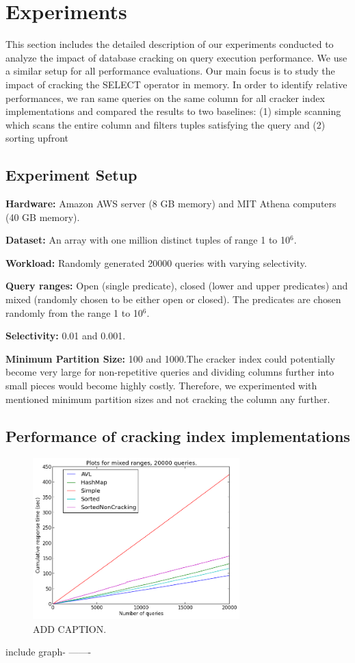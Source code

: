 \section{Experiments}
This section includes the detailed description of our experiments conducted to analyze the impact of database cracking on query execution performance. We use a similar setup for all performance evaluations. Our main focus is to study the impact of cracking the SELECT operator in memory. In order to identify relative performances, we ran same queries on the same column for all cracker index implementations and compared the results to two baselines: (1) simple scanning which scans the entire column and filters tuples satisfying the query and (2) sorting upfront 

\subsection{Experiment Setup}

\textbf{Hardware:} Amazon AWS server (8 GB memory) and MIT Athena computers (40 GB memory). 

\textbf{Dataset:} An array with one million distinct tuples of range 1 to 10${^6}$. 

\textbf{Workload:} Randomly generated 20000 queries with varying selectivity.

\textbf{Query ranges:} Open (single predicate), closed (lower and upper predicates) and mixed (randomly chosen to be either open or closed).
The predicates are chosen randomly from the range 1 to 10${^6}$.

\textbf{Selectivity:} 0.01 and 0.001. 

\textbf{Minimum Partition Size: } 100 and 1000.The cracker index could potentially become very large for non-repetitive queries and dividing columns further into small pieces would become highly costly. Therefore, we experimented with mentioned minimum partition sizes and not cracking the column any further.
\subsection{Performance of cracking index implementations}

\begin{figure}[h]
\includegraphics[width=8cm]{figures/mixed20000}
\caption{ADD CAPTION.}
\label{fig:some}
\end{figure}
include graph- -------

